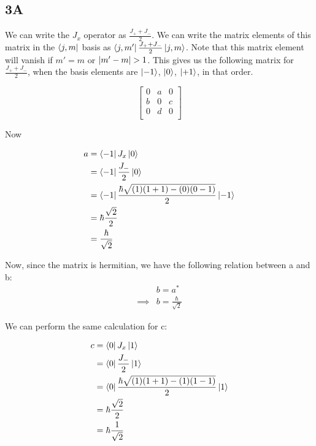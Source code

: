 
\subsection*{3A}

We can write the $J_x$ operator as $\frac{J_+ + J_-}{2}$. We can write the matrix elements of this matrix in the $\bra{j,m}$ basis as $\bra{j,m'} \frac{J_+ + J_-}{2} \ket{j,m}$. Note that this matrix element will vanish if $m' = m$ or $\abs{m' - m} > 1$. This gives us the following matrix for $\frac{J_+ + J_-}{2}$, when the basis elements are $\ket{-1}$, $\ket{0}$, $\ket{+1}$, in that order.

\begin{equation}
    \begin{bmatrix}
    0 & a & 0 \\
    b & 0 & c \\
    0 & d & 0 \\
    \end{bmatrix}
\end{equation}

Now

\begin{equation}
    \begin{split}
        a &= \bra{-1} J_x \ket{0} \\
        &= \bra{-1} \frac{J_-}{2} \ket{0} \\ 
        &= \bra{-1} \frac{\hbar \sqrt{(1)(1+1) - (0)(0 - 1)}}{2} \ket{-1}\\
        &= \hbar \frac{\sqrt{2}}{2} \\
        &= \frac{\hbar}{\sqrt{2}}
    \end{split}
\end{equation}

Now, since the matrix is hermitian, we have the following relation between a and b:
\begin{equation}
\begin{split}
    & b = a^* \\
    \implies & b = \frac{\hbar}{\sqrt{2}}
\end{split}
\end{equation}

We can perform the same calculation for c:

\begin{equation}
    \begin{split}
        c &= \bra{0} J_x \ket{1} \\
        &= \bra{0} \frac{J_-}{2} \ket{1} \\ 
        &= \bra{0} \frac{\hbar \sqrt{(1)(1+1) - (1)(1 - 1)}}{2} \ket{1}\\
        &= \hbar \frac{\sqrt{2}}{2} \\
        &= \hbar \frac{1}{\sqrt{2}}
    \end{split}
\end{equation}


